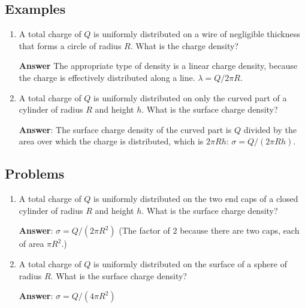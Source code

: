 \documentclass{article}
\begin{document}
\subsection{Examples}

\begin{enumerate}

  \item A total charge of $Q$ is uniformly distributed on a wire of negligible thickness that forms a circle of radius $R$. What is the charge density?

        \textbf{Answer} The appropriate type of density is a linear charge density, because the charge is effectively distributed along a line. $\lambda=Q/2\pi R$.

  \item A total charge of $Q$ is uniformly distributed on only the curved part of a cylinder of radius $R$ and height $h$. What is the surface charge density?

        \textbf{Answer}: The surface charge density of the curved part is $Q$ divided by the area over which the charge is distributed, which is $2\pi R h$: $\sigma=Q/(2\pi R  h)$.

\end{enumerate}

\newpage

\subsection{Problems}

\begin{enumerate}

  \item A total charge of $Q$ is uniformly distributed on the two end caps of a closed cylinder of radius $R$ and height $h$. What is the surface charge density?

        \ifsolutions
        \textbf{Answer}: $\sigma = Q/ (2 \pi R^2)$ (The factor of $2$ because there are two caps, each of area $\pi R^2$.)
        \else
        \vskip 72pt
        \fi

  \item A total charge of $Q$ is uniformly distributed on the surface of a sphere of radius $R$. What is the surface charge density?

        \ifsolutions
        \textbf{Answer}: $\sigma = Q/ (4 \pi R^2)$
        \else
        \vskip 72pt
        \fi

\end{enumerate}
\end{document}
